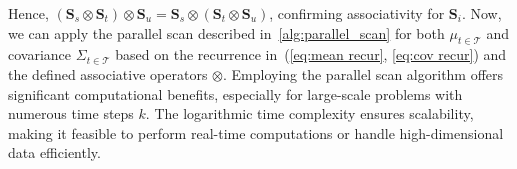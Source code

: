 Hence, $(\mathbf{S}_s \otimes \mathbf{S}_t) \otimes \mathbf{S}_u = \mathbf{S}_s \otimes (\mathbf{S}_t \otimes \mathbf{S}_u)$, confirming associativity for $\mathbf{S}_i$. Now, we can apply the parallel scan described in~\cref{alg:parallel_scan} for both $\mu_{t \in \mathcal{T}}$ and covariance $\Sigma_{t \in \mathcal{T}}$ based on the recurrence in~(\ref{eq:mean recur}, \ref{eq:cov recur}) and the defined associative operators $\otimes$. Employing the parallel scan algorithm offers significant computational benefits, especially for large-scale problems with numerous time steps $k$. The logarithmic time complexity ensures scalability, making it feasible to perform real-time computations or handle high-dimensional data efficiently.


























